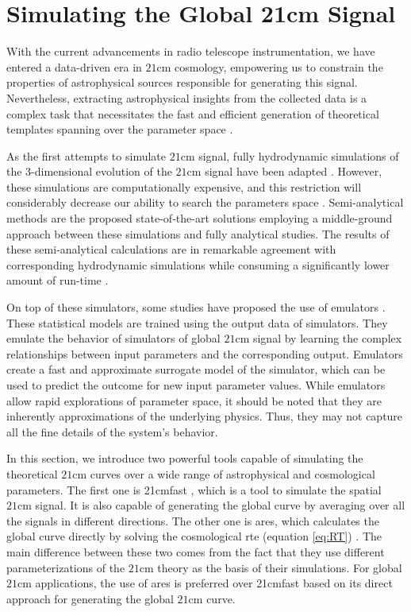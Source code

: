 \documentclass[12pt, TexShade, letterpaper]{report}
\begin{document}
\section{Simulating the Global 21cm Signal}
With the current advancements in radio telescope instrumentation, we have entered a data-driven era in $\mathrm{21cm}$ cosmology, empowering us to constrain the properties of astrophysical sources responsible for generating this signal. Nevertheless, extracting astrophysical insights from the collected data is a complex task that necessitates the fast and efficient generation of theoretical templates spanning over the parameter space \cite{emulate_21cm}. \par
As the first attempts to simulate $\mathrm{21cm}$ signal, fully hydrodynamic simulations of the 3-dimensional evolution of the $\mathrm{21cm}$ signal have been adapted \cite{hydrodynamic_sim}. However, these simulations are computationally expensive, and this restriction will considerably decrease our ability to search the parameters space \cite{ares2014jordan}. 
Semi-analytical methods are the proposed state-of-the-art solutions employing a middle-ground approach between these simulations and fully analytical studies. The results of these semi-analytical calculations are in remarkable agreement with corresponding hydrodynamic simulations while consuming a significantly lower amount of run-time \cite{semi_analytic_1, semi_analytic_2, semi_analytic_3, semi_analytic_4, semi-analytic_5}. \par
On top of these simulators, some studies have proposed the use of emulators \cite{emulate_21cm, emulate_21cm_2, emulate_21cm_3}. These statistical models are trained using the output data of simulators. They emulate the behavior of simulators of global $\mathrm{21cm}$ signal by learning the complex relationships between input parameters and the corresponding output. Emulators create a fast and approximate surrogate model of the simulator, which can be used to predict the outcome for new input parameter values. While emulators allow rapid explorations of parameter space, it should be noted that they are inherently approximations of the underlying physics. Thus, they may not capture all the fine details of the system's behavior.\par
In this section, we introduce two powerful tools capable of simulating the theoretical $\mathrm{21cm}$ curves over a wide range of astrophysical and cosmological parameters. The first one is \gls{21cmfast} \cite{21cmfast_c, 21cmfast_python}, which is a tool to simulate the spatial $\mathrm{21cm}$ signal. It is also capable of generating the global curve by averaging over all the signals in different directions. The other one is \gls{ares}, which calculates the global curve directly by solving the cosmological \gls{rte} (equation \ref{eq:RT}) \cite{ares2014jordan}. The main difference between these two comes from the fact that they use different parameterizations of the $\mathrm{21cm}$ theory as the basis of their simulations. For global $\mathrm{21cm}$ applications, the use of \gls{ares} is preferred over \gls{21cmfast} based on its direct approach for generating the global $\mathrm{21cm}$ curve. \par
\end{document}
